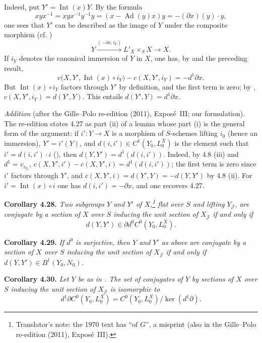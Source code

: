 Indeed, put \(Y'=\operatorname{Int}(x)Y\). By the formula
\[
 xyx^{-1}=xyx^{-1}y^{-1}y
 =(x-\operatorname{Ad}(y)x)y=-(\partial x)(y)\cdot y,
\]
one sees that \(Y'\) can be described as the image of \(Y\) under the
composite morphism (cf. )
\[
 Y\xrightarrow{(-\partial x,i_Y)}L'_X\mathbin{\times_S}X
 \longrightarrow X.
\]
If \(i_Y\) denotes the canonical immersion of \(Y\) in \(X\), one has, by
 and the preceding result,
\[
 c\bigl(X,Y',\operatorname{Int}(x)\circ i_Y\bigr)-c(X,Y',i_Y)
 =-d^1\partial x.
\]
But \(\operatorname{Int}(x)\circ i_Y\) factors through \(Y'\) by
definition, and the first term is zero; by ,
\(c(X,Y',i_Y)=d(Y',Y)\). This entails \(d(Y',Y)=d^1\partial x\).

\emph{Addition} (after the Gille--Polo re-edition (2011), Exposé~III; our
formulation). The re-edition states 4.27 as part (ii) of a lemma whose part
(i) is the general form of the argument: if \(i'\colon Y\to X\) is a
morphism of \(S\)-schemes lifting \(i_0\) (hence an immersion),
\(Y'=i'(Y)\), and \(d(i,i')\in C^1(Y_0,L_0^X)\) is the element such that
\(i'=d(i,i')\cdot i\) (), then \(d(Y,Y')=d^1(d(i,i'))\). Indeed, by
4.8 (iii) and \(d^1=v_{i_{Y_0}}\),
\(c(X,Y',i')-c(X,Y',i)=d^1(d(i,i'))\); the first term is zero since \(i'\)
factors through \(Y'\), and \(c(X,Y',i)=d(Y',Y)=-d(Y,Y')\) by 4.8 (ii). For
\(i'=\operatorname{Int}(x)\circ i\) one has \(d(i,i')=-\partial x\), and one
recovers 4.27.

\medskip
\noindent{}\textbf{Corollary 4.28.}
\textit{Two subgroups \(Y\) and \(Y'\) of \(X\),\footnote{Translator's note:
the 1970 text has ``of \(G\)'', a misprint (also in the Gille--Polo re-edition
(2011), Exposé~III).} flat over \(S\) and
lifting \(Y_{\mathscr J}\), are conjugate by a section of \(X\) over
\(S\) inducing the unit section of \(X_{\mathscr J}\) if and only if}
\[
 d(Y,Y')\in
 \partial d^0 C^0(Y_0,L_0^X).
\]

\medskip
\noindent{}\textbf{Corollary 4.29.}
\textit{If \(d^0\) is surjective, then \(Y\) and \(Y'\) as above are
conjugate by a section of \(X\) over \(S\) inducing the unit section of
\(X_{\mathscr J}\) if and only if \(d(Y,Y')\in B^1(Y_0,N_0)\).}

\medskip
\noindent{}\textbf{Corollary 4.30.}
\textit{Let \(Y\) be as in . The set of conjugates of \(Y\) by
sections of \(X\) over \(S\) inducing the unit section of
\(X_{\mathscr J}\) is isomorphic to}
\[
 d^1\partial C^0(Y_0,L_0^X)
 =C^0(Y_0,L_0^X)\big/\ker(d^1\partial).
\]

